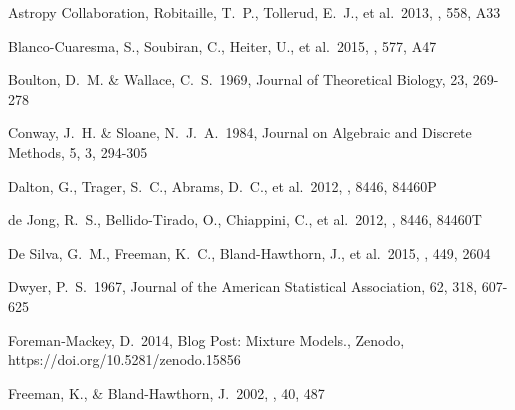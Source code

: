 \documentclass{aastex61}
\begin{document}
\begin{thebibliography}{}




 Astropy Collaboration, Robitaille, T.~P., Tollerud, E.~J., et al.\ 2013, \aap, 558, A33 %

 Blanco-Cuaresma, S., Soubiran, C., Heiter, U., et al.\ 2015, \aap, 577, A47 %

 Boulton, D.~M. \& Wallace, C.~S.\ 1969, Journal of Theoretical Biology, 23, 269-278 

 Conway, J.~H. \& Sloane, N.~J.~A.\ 1984, Journal on Algebraic and Discrete Methods, 5, 3, 294-305 %

 Dalton, G., Trager, S.~C., Abrams, D.~C., et al.\ 2012, \procspie, 8446, 84460P %

 de Jong, R.~S., Bellido-Tirado, O., Chiappini, C., et al.\ 2012, \procspie, 8446, 84460T %

 De Silva, G.~M., Freeman, K.~C., Bland-Hawthorn, J., et al.\ 2015, \mnras, 449, 2604 %


 Dwyer, P.~S.\ 1967, Journal of the American Statistical Association, 62, 318, 607-625

 Foreman-Mackey, D.\ 2014, Blog Post: Mixture Models., Zenodo, https://doi.org/10.5281/zenodo.15856 %

 Freeman, K., \& Bland-Hawthorn, J.\ 2002, \araa, 40, 487 %


\end{thebibliography}
\end{document}
